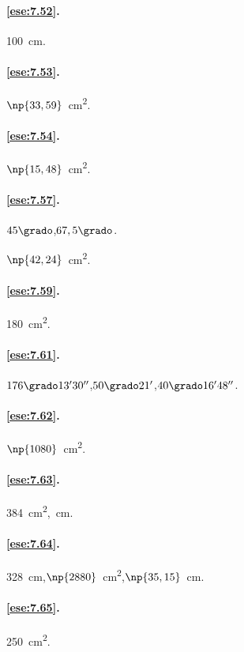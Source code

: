\paragraph{\ref{ese:7.52}.}
100~cm.

\paragraph{\ref{ese:7.53}.}
$\np{33,59}$~cm\textsuperscript{2}.

\paragraph{\ref{ese:7.54}.}
$\np{15,48}$~cm\textsuperscript{2}.

\paragraph{\ref{ese:7.57}.}
$45\grado$,\quad $67,5\grado$.

$\np{42,24}$~cm\textsuperscript{2}.

\paragraph{\ref{ese:7.59}.}
180~cm\textsuperscript{2}.

\paragraph{\ref{ese:7.61}.}
$176\grado13'30''$,\quad $50\grado21'$,\quad $40\grado16'48''$.

\paragraph{\ref{ese:7.62}.}
$\np{1080}$~cm\textsuperscript{2}.

\paragraph{\ref{ese:7.63}.}
384~cm\textsuperscript{2},~cm.

\paragraph{\ref{ese:7.64}.}
328~cm,\quad $\np{2880}$~cm\textsuperscript{2},\quad $\np{35,15}$~cm.

\paragraph{\ref{ese:7.65}.}
250~cm\textsuperscript{2}.

